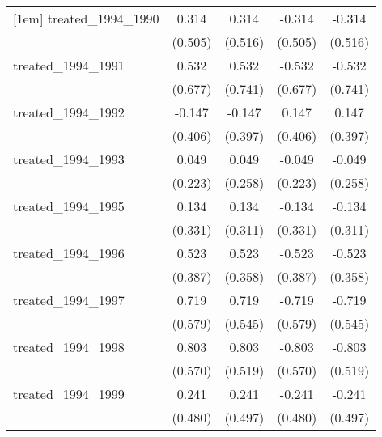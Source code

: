 {\begin{tabular}{l*{4}{c}}
[1em]
treated\_1994\_1990&       0.314         &       0.314         &      -0.314         &      -0.314         \\
            &     (0.505)         &     (0.516)         &     (0.505)         &     (0.516)         \\
[1em]
treated\_1994\_1991&       0.532         &       0.532         &      -0.532         &      -0.532         \\
            &     (0.677)         &     (0.741)         &     (0.677)         &     (0.741)         \\
[1em]
treated\_1994\_1992&      -0.147         &      -0.147         &       0.147         &       0.147         \\
            &     (0.406)         &     (0.397)         &     (0.406)         &     (0.397)         \\
[1em]
treated\_1994\_1993&       0.049         &       0.049         &      -0.049         &      -0.049         \\
            &     (0.223)         &     (0.258)         &     (0.223)         &     (0.258)         \\
[1em]
treated\_1994\_1995&       0.134         &       0.134         &      -0.134         &      -0.134         \\
            &     (0.331)         &     (0.311)         &     (0.331)         &     (0.311)         \\
[1em]
treated\_1994\_1996&       0.523         &       0.523         &      -0.523         &      -0.523         \\
            &     (0.387)         &     (0.358)         &     (0.387)         &     (0.358)         \\
[1em]
treated\_1994\_1997&       0.719         &       0.719         &      -0.719         &      -0.719         \\
            &     (0.579)         &     (0.545)         &     (0.579)         &     (0.545)         \\
[1em]
treated\_1994\_1998&       0.803         &       0.803         &      -0.803         &      -0.803         \\
            &     (0.570)         &     (0.519)         &     (0.570)         &     (0.519)         \\
[1em]
treated\_1994\_1999&       0.241         &       0.241         &      -0.241         &      -0.241         \\
            &     (0.480)         &     (0.497)         &     (0.480)         &     (0.497)         \\

\end{tabular}}
